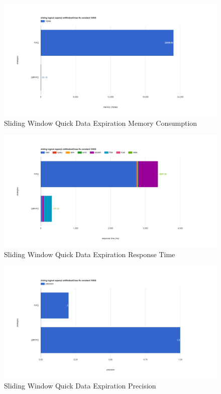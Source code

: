 \begin{figure}[!htbp]
	\centering
    \includegraphics[width=6.5in]{img/app3-slide-quick-m.png}
    \caption{Sliding Window Quick Data Expiration Memory Consumption}
\end{figure}
\begin{figure}[!htbp]
	\centering
    \includegraphics[width=6.5in]{img/app3-slide-quick-r.png}
    \caption{Sliding Window Quick Data Expiration Response Time}
\end{figure}
\begin{figure}[!htbp]
	\centering
    \includegraphics[width=6.5in]{img/app3-slide-quick-p.png}
    \caption{Sliding Window Quick Data Expiration Precision}
\end{figure}
